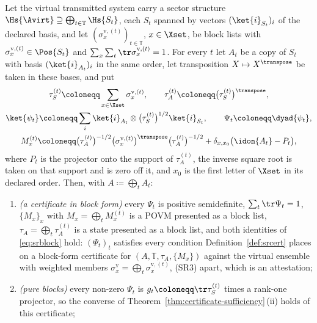 \begin{lemma}\label{lem:ensemble-presentation}
Let the virtual transmitted system carry a sector structure
$\Hs{\Avirt}\supseteq\bigoplus_{t\in\mathbb{T}}\Hs{S_t}$, each $S_t$ spanned
by vectors $(\ket{i}_{S_t})_i$ of the declared basis, and let
$(\sigma^{\mathrm v,(t)}_x)_{t\in\mathbb{T}}$, $x\in\Xset$, be block lists
with $\sigma^{\mathrm v,(t)}_x\in\Pos{S_t}$ and
$\sum_{x}\sum_t\tr\sigma^{\mathrm v,(t)}_x=1$. For every $t$ let $A_t$ be a
copy of $S_t$ with basis $(\ket{i}_{A_t})_i$ in the same order, let
transposition $X\mapsto X^{\transpose}$ be taken in these bases, and put
\begin{equation}\label{eq:enspres}
\begin{gathered}
  \tau^{(t)}_{S}\coloneqq\sum_{x\in\Xset}\sigma^{\mathrm v,(t)}_x ,\qquad
  \tau^{(t)}_A\coloneqq\big(\tau^{(t)}_{S}\big)^{\transpose} ,\\
  \ket{\psi_t}\coloneqq\sum_i\ket{i}_{A_t}\otimes
     \big(\tau^{(t)}_{S}\big)^{1/2}\ket{i}_{S_t} ,\qquad
  \Psi_t\coloneqq\dyad{\psi_t} ,\\
  M^{(t)}_x\coloneqq\big(\tau^{(t)}_A\big)^{-1/2}
     \big(\sigma^{\mathrm v,(t)}_x\big)^{\transpose}
     \big(\tau^{(t)}_A\big)^{-1/2}
     +\delta_{x,x_0}\big(\idon{A_t}-P_t\big) ,
\end{gathered}
\end{equation}
where $P_t$ is the projector onto the support of $\tau^{(t)}_A$, the inverse
square root is taken on that support and is zero off it, and $x_0$ is the
first letter of $\Xset$ in its declared order. Then, with
$A\coloneqq\bigoplus_tA_t$:
\begin{enumerate}[label=(\roman*),leftmargin=2.2em]
\item \emph{(a certificate in block form)} every $\Psi_t$ is positive
semidefinite, $\sum_t\tr\Psi_t=1$, $\{M_x\}_x$ with
$M_x=\bigoplus_tM^{(t)}_x$ is a POVM presented as a block list,
$\tau_A=\bigoplus_t\tau^{(t)}_A$ is a state presented as a block list, and
both identities of \eqref{eq:srblock} hold: $(\Psi_t)_t$ satisfies every
condition Definition~\ref{def:srcert} places on a block-form certificate
for $(A,\mathbb{T},\tau_A,\{M_x\})$ against the virtual ensemble with
weighted members $\sigma^{\mathrm v}_x=\bigoplus_t\sigma^{\mathrm v,(t)}_x$,
(SR3) apart, which is an attestation;
\item \emph{(pure blocks)} every non-zero $\Psi_t$ is
$g_t\coloneqq\tr\tau^{(t)}_S$ times a rank-one projector, so the converse of
Theorem~\ref{thm:certificate-sufficiency}\,(ii) holds of this certificate;

\end{enumerate}
\end{lemma}
